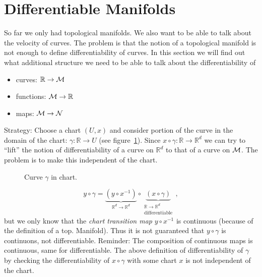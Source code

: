 \documentclass[11pt, a4paper, twocolumn]{article} %
\begin{document}
\section{Differentiable Manifolds}
So far we only had topological manifolds. We also want to be able to talk about the velocity of
curves. The problem is that the notion of a topological manifold is not enough to define
differentiability of curves. In this section we will find out what additional structure we need
to be able to talk about the differentiability of
\begin{itemize}
    \item curves: $\mathbb{R}\to \mathcal{M}$
    \item functions: $\mathcal{M}\to \mathbb{R}$
    \item maps: $\mathcal{M}\to\mathcal{N}$
\end{itemize}
Strategy: Choose a chart $(U, x)$ and consider portion of the curve in the domain of the chart:
$\gamma: \mathbb{R}\to U$ (see figure~\ref{fig:curvechart}). Since $x\circ\gamma: \mathbb{R}\to\mathbb{R}^d$
we can try to ``lift'' the notion of differentiability of a curve on $\mathbb{R}^d$ to that of
a curve on $\mathcal{M}$. The problem is to make this independent of the chart.
\begin{figure}[tbh]
    \centering
    \caption{Curve $\gamma$ in chart.}
    \label{fig:curvechart}
\end{figure}
\begin{equation}
    y\circ\gamma = \underbrace{(y\circ x^{-1})}_{\mathbb{R}^d\to\mathbb{R}^d}\circ \underbrace{(x\circ\gamma)}_{\substack{\mathbb{R}\to\mathbb{R}^d\\ \text{differentiable}}}\,,
\end{equation}
but we only know that the \textit{chart transition map} $y\circ x^{-1}$ is continuous (because of the definition of a top. Manifold). Thus it is not guaranteed that
$y\circ \gamma$ is continuons, not differentiable. Reminder: The composition of continuous maps is continuous,
same for differentiable. 
The above definition of differentiability of $\gamma$ by
checking the differentiability of $x\circ\gamma$ with some chart $x$ is not independent of the chart.
\end{document}
